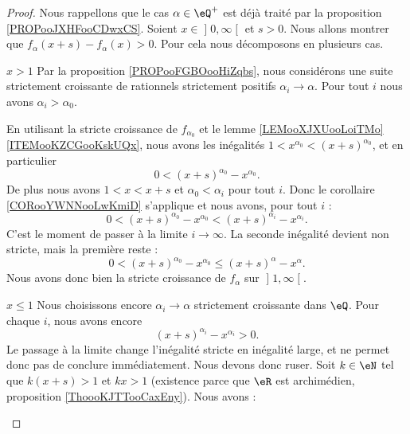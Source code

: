 \begin{proof}
    Nous rappellons que le cas \( \alpha\in \eQ^+\) est déjà traité par la proposition \ref{PROPooJXHFooCDwxCS}. Soient \( x\in \mathopen] 0 , \infty \mathclose[\) et \( s>0\). Nous allons montrer que \( f_{\alpha}(x+s)-f_{\alpha}(x)>0\). Pour cela nous décomposons en plusieurs cas.
    \begin{subproof}
        \item[\( x>1\)]
            Par la proposition \ref{PROPooFGBOooHiZqbs}, nous considérons une suite strictement croissante de rationnels strictement positifs \( \alpha_i\to \alpha\). Pour tout \( i\) nous avons \( \alpha_i>\alpha_0\).

            En utilisant la stricte croissance de \( f_{\alpha_0}\) et le lemme \ref{LEMooXJXUooLoiTMo}\ref{ITEMooKZCGooKskUQx}, nous avons les inégalités \( 1<x^{\alpha_0}<(x+s)^{\alpha_0}\), et en particulier
            \begin{equation}
                0<(x+s)^{\alpha_0}-x^{\alpha_0}.
            \end{equation}
            De plus nous avons \( 1<x<x+s\) et \( \alpha_0<\alpha_i\) pour tout \( i\). Donc le corollaire \ref{CORooYWNNooLwKmiD} s'applique et nous avons, pour tout \( i\) :
            \begin{equation}
                0<(x+s)^{\alpha_0}-x^{\alpha_0}<(x+s)^{\alpha_i}-x^{\alpha_i}.
            \end{equation}
            C'est le moment de passer à la limite \( i\to \infty\). La seconde inégalité devient non stricte, mais la première reste :
            \begin{equation}
                0<(x+s)^{\alpha_0}-x^{\alpha_0}\leq(x+s)^{\alpha}-x^{\alpha}.
            \end{equation}
            Nous avons donc bien la stricte croissance de \( f_{\alpha}\) sur \( \mathopen] 1 , \infty \mathclose[\).
        \item[\( x\leq 1\)]
            Nous choisissons encore \( \alpha_i\to \alpha\) strictement croissante dans \( \eQ\). Pour chaque \( i\), nous avons encore
            \begin{equation}
                (x+s)^{\alpha_i}-x^{\alpha_i}>0.
            \end{equation}
            Le passage à la limite change l'inégalité stricte en inégalité large, et ne permet donc pas de conclure immédiatement. Nous devons donc ruser. Soit \( k\in \eN\) tel que \( k(x+s)>1\) et \( kx>1\) (existence parce que \( \eR\) est archimédien, proposition \ref{ThoooKJTTooCaxEny}). Nous avons :

\end{subproof}
\end{proof}
